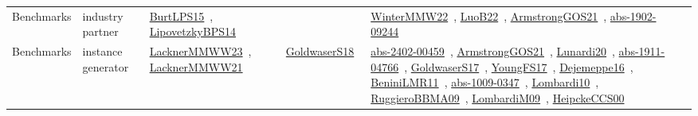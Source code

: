 {\begin{longtable}{lp{3cm}>{\raggedright\arraybackslash}p{6cm}>{\raggedright\arraybackslash}p{6cm}>{\raggedright\arraybackslash}p{8cm}}
Benchmarks & industry partner & \href{works/BurtLPS15.pdf}{BurtLPS15}~\cite{BurtLPS15}, \href{works/LipovetzkyBPS14.pdf}{LipovetzkyBPS14}~\cite{LipovetzkyBPS14} &  & \href{works/WinterMMW22.pdf}{WinterMMW22}~\cite{WinterMMW22}, \href{works/LuoB22.pdf}{LuoB22}~\cite{LuoB22}, \href{works/ArmstrongGOS21.pdf}{ArmstrongGOS21}~\cite{ArmstrongGOS21}, \href{works/abs-1902-09244.pdf}{abs-1902-09244}~\cite{abs-1902-09244}\\
Benchmarks & instance generator & \href{works/LacknerMMWW23.pdf}{LacknerMMWW23}~\cite{LacknerMMWW23}, \href{works/LacknerMMWW21.pdf}{LacknerMMWW21}~\cite{LacknerMMWW21} & \href{works/GoldwaserS18.pdf}{GoldwaserS18}~\cite{GoldwaserS18} & \href{works/abs-2402-00459.pdf}{abs-2402-00459}~\cite{abs-2402-00459}, \href{works/ArmstrongGOS21.pdf}{ArmstrongGOS21}~\cite{ArmstrongGOS21}, \href{works/Lunardi20.pdf}{Lunardi20}~\cite{Lunardi20}, \href{works/abs-1911-04766.pdf}{abs-1911-04766}~\cite{abs-1911-04766}, \href{works/GoldwaserS17.pdf}{GoldwaserS17}~\cite{GoldwaserS17}, \href{works/YoungFS17.pdf}{YoungFS17}~\cite{YoungFS17}, \href{works/Dejemeppe16.pdf}{Dejemeppe16}~\cite{Dejemeppe16}, \href{works/BeniniLMR11.pdf}{BeniniLMR11}~\cite{BeniniLMR11}, \href{works/abs-1009-0347.pdf}{abs-1009-0347}~\cite{abs-1009-0347}, \href{works/Lombardi10.pdf}{Lombardi10}~\cite{Lombardi10}, \href{works/RuggieroBBMA09.pdf}{RuggieroBBMA09}~\cite{RuggieroBBMA09}, \href{works/LombardiM09.pdf}{LombardiM09}~\cite{LombardiM09}, \href{works/HeipckeCCS00.pdf}{HeipckeCCS00}~\cite{HeipckeCCS00}\\

\end{longtable}}
